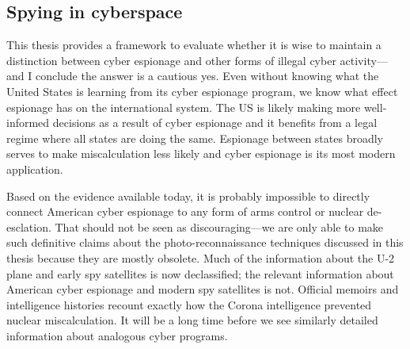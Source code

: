 \documentclass[11pt]{memoir}
\begin{document}

\subsection{Spying in cyberspace}
This thesis provides a framework to evaluate whether it is wise to maintain a distinction between cyber espionage and other forms of illegal cyber activity---and I conclude the answer is a cautious yes. Even without knowing what the United States is learning from its cyber espionage program, we know what effect espionage has on the international system. The US is likely making more well-informed decisions as a result of cyber espionage and it benefits from a legal regime where all states are doing the same. Espionage between states broadly serves to make miscalculation less likely and cyber espionage is its most modern application.

Based on the evidence available today, it is probably impossible to directly connect American cyber espionage to any form of arms control or nuclear de-esclation. That should not be seen as discouraging---we are only able to make such definitive claims about the photo-reconnaissance techniques discussed in this thesis because they are mostly obsolete. Much of the information about the U-2 plane and early spy satellites is now declassified; the relevant information about American cyber espionage and modern spy satellites is not. Official memoirs and intelligence histories recount exactly how the Corona intelligence prevented nuclear miscalculation. It will be a long time before we see similarly detailed information about analogous cyber programs.
\end{document}
